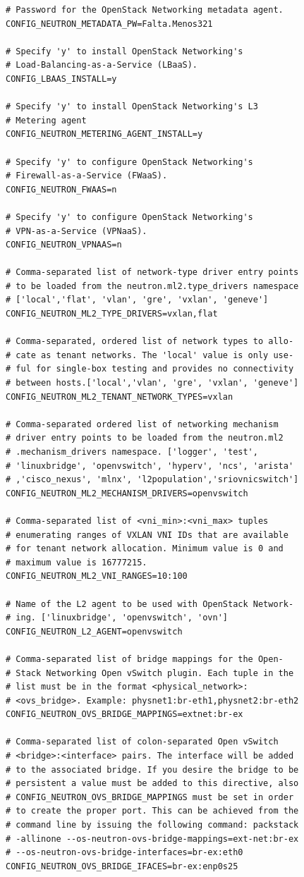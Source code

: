\documentclass[12pt,a4paper,oneside]{book}
\begin{document}
\begin{lstlisting}[style=codigobase,  caption= answers.cfg]
# Password for the OpenStack Networking metadata agent.
CONFIG_NEUTRON_METADATA_PW=Falta.Menos321

# Specify 'y' to install OpenStack Networking's 
# Load-Balancing-as-a-Service (LBaaS).
CONFIG_LBAAS_INSTALL=y

# Specify 'y' to install OpenStack Networking's L3 
# Metering agent
CONFIG_NEUTRON_METERING_AGENT_INSTALL=y

# Specify 'y' to configure OpenStack Networking's
# Firewall-as-a-Service (FWaaS).
CONFIG_NEUTRON_FWAAS=n

# Specify 'y' to configure OpenStack Networking's 
# VPN-as-a-Service (VPNaaS).
CONFIG_NEUTRON_VPNAAS=n

# Comma-separated list of network-type driver entry points
# to be loaded from the neutron.ml2.type_drivers namespace
# ['local','flat', 'vlan', 'gre', 'vxlan', 'geneve']
CONFIG_NEUTRON_ML2_TYPE_DRIVERS=vxlan,flat

# Comma-separated, ordered list of network types to allo-
# cate as tenant networks. The 'local' value is only use-
# ful for single-box testing and provides no connectivity
# between hosts.['local','vlan', 'gre', 'vxlan', 'geneve']
CONFIG_NEUTRON_ML2_TENANT_NETWORK_TYPES=vxlan

# Comma-separated ordered list of networking mechanism 
# driver entry points to be loaded from the neutron.ml2
# .mechanism_drivers namespace. ['logger', 'test', 
# 'linuxbridge', 'openvswitch', 'hyperv', 'ncs', 'arista'
# ,'cisco_nexus', 'mlnx', 'l2population','sriovnicswitch']
CONFIG_NEUTRON_ML2_MECHANISM_DRIVERS=openvswitch

# Comma-separated list of <vni_min>:<vni_max> tuples 
# enumerating ranges of VXLAN VNI IDs that are available
# for tenant network allocation. Minimum value is 0 and 
# maximum value is 16777215.
CONFIG_NEUTRON_ML2_VNI_RANGES=10:100

# Name of the L2 agent to be used with OpenStack Network-
# ing. ['linuxbridge', 'openvswitch', 'ovn']
CONFIG_NEUTRON_L2_AGENT=openvswitch

# Comma-separated list of bridge mappings for the Open-
# Stack Networking Open vSwitch plugin. Each tuple in the
# list must be in the format <physical_network>:
# <ovs_bridge>. Example: physnet1:br-eth1,physnet2:br-eth2
CONFIG_NEUTRON_OVS_BRIDGE_MAPPINGS=extnet:br-ex

# Comma-separated list of colon-separated Open vSwitch
# <bridge>:<interface> pairs. The interface will be added 
# to the associated bridge. If you desire the bridge to be
# persistent a value must be added to this directive, also
# CONFIG_NEUTRON_OVS_BRIDGE_MAPPINGS must be set in order
# to create the proper port. This can be achieved from the
# command line by issuing the following command: packstack 
# -allinone --os-neutron-ovs-bridge-mappings=ext-net:br-ex  
# --os-neutron-ovs-bridge-interfaces=br-ex:eth0
CONFIG_NEUTRON_OVS_BRIDGE_IFACES=br-ex:enp0s25


\end{lstlisting}
\end{document}
